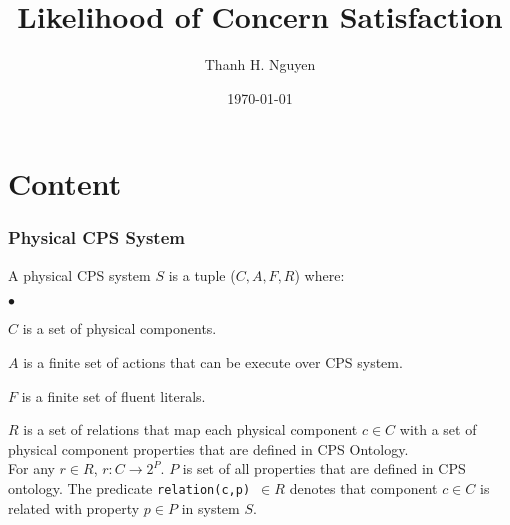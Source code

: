\documentclass{beamer}
\title[Likelihood]{Likelihood of Concern Satisfaction} %
\author{Thanh H. Nguyen} %
\institute[NMSU] %
{
New Mexico State University \\ %
\medskip
\textit{tnguyen@cs.nmsu.edu} %
}
\date{\today} %
\begin{document}
\begin{frame}
\titlepage %
\end{frame}




\section{Content} 

\begin{frame}
	\frametitle{Physical CPS System}
	\begin{definition}
		\label{def:physical_CPS_system} 
		A physical CPS system $S$ is a tuple ($C, A, F, R$) where:
		\begin{list}{$\bullet$}{\itemsep=0pt \parsep=1pt \topsep=1pt \leftmargin=12pt} 
			\item $C$ is a set of physical components.
			\item $A$ is a finite set of actions that can be execute over CPS system.
			\item $F$ is a finite set of fluent literals.
			\item $R$ is a set of relations that map each physical component $c \in C$ with a set of physical component properties that are defined in CPS Ontology.  \\
			For any $r \in R$, $r : C \longrightarrow 2^{P}$. $P$ is set of all properties that are defined in CPS ontology. The predicate {\tt relation(c,p) $\in R$} denotes that component $c \in C$ is related with property $p \in P$ in system $S$. 		 
		\end{list}
	\end{definition}
\end{frame}
\end{document}
